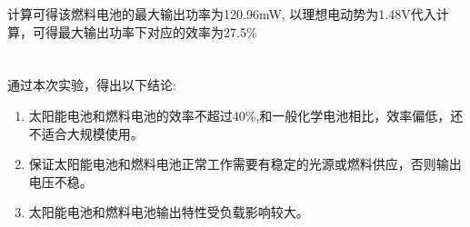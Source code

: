 ﻿\documentclass[10.5pt]{ctexart}
\begin{document}
计算可得该燃料电池的最大输出功率为120.96mW,
以理想电动势为1.48V代入计算，可得最大输出功率下对应的效率为27.5\%




\subsection{\textbf{}}

\section{\textbf{}}

通过本次实验，得出以下结论:
\begin{enumerate}
\item 太阳能电池和燃料电池的效率不超过40\%,和一般化学电池相比，效率偏低，还不适合大规模使用。
\item 保证太阳能电池和燃料电池正常工作需要有稳定的光源或燃料供应，否则输出电压不稳。
\item 太阳能电池和燃料电池输出特性受负载影响较大。
\end{enumerate}
\end{document}
